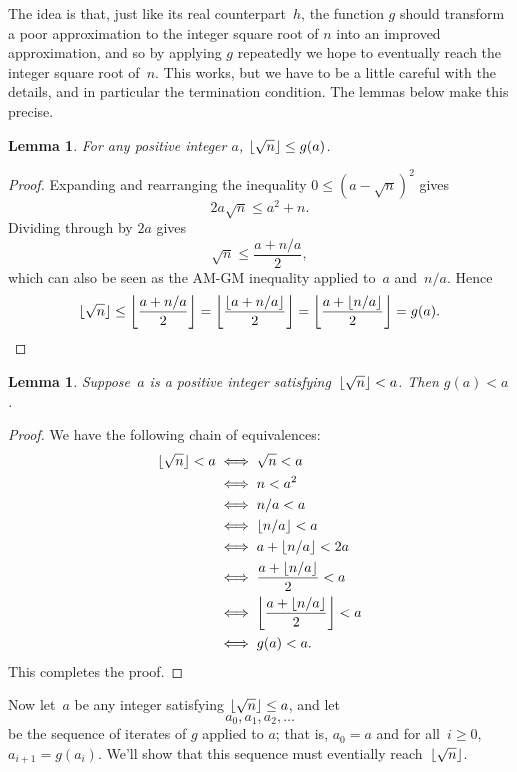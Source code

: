 \documentclass[a4paper]{article}
\DeclarePairedDelimiter\floor{\lfloor}{\rfloor}
\theoremstyle{plain}
\newtheorem{lemma}[theorem]{Lemma}
\theoremstyle{definition}
\begin{document}
The idea is that, just like its real counterpart~$h$, the function $g$ should
transform a poor approximation to the integer square root of $n$ into an
improved approximation, and so by applying $g$ repeatedly we hope to eventually
reach the integer square root of~$n$. This works, but we have to be a little
careful with the details, and in particular the termination condition. The
lemmas below make this precise.

\begin{lemma}\label{heron_high}
  For any positive integer $a$, $\floor{\sqrt n} \le g(a)$.
\end{lemma}

\begin{proof}
  Expanding and rearranging the inequality $0 \le (a - \sqrt n)^2$ gives
  $$2a\sqrt n \le a^2 + n.$$
  Dividing through by $2a$ gives
  $$\sqrt n \le \frac{a + n/a}2,$$
  which can also be seen as the AM-GM inequality applied to~$a$ and~$n/a$.
  Hence
  $$\floor{\sqrt n} \le \floor*{\frac{a + n/a}2}
  = \floor*{\frac{\floor{a + n/a}}2}
  = \floor*{\frac{a + \floor{n/a}}2} = g(a).$$
\end{proof}

\begin{lemma}\label{heron_decreases}
  Suppose~$a$ is a positive integer satisfying~$\floor{\sqrt n} < a$. Then
  $g(a) < a$.
\end{lemma}

\begin{proof}
  We have the following chain of equivalences:
  \begin{align*}
    \floor{\sqrt n} < a &\iff \sqrt n < a \\
                        &\iff n < a^2 \\
                        &\iff n/a < a \\
                        &\iff \floor{n/a} < a \\
                        &\iff a + \floor{n/a} < 2a \\
                        &\iff \frac{a + \floor{n/a}}2 < a \\
                        &\iff \floor*{\frac{a + \floor{n/a}}2} < a \\
                        &\iff g(a) < a.
  \end{align*}
  This completes the proof.
\end{proof}

Now let~$a$ be any integer satisfying $\floor{\sqrt n} \le a$, and let
$$a_0, a_1, a_2, \dots$$ be the sequence of iterates of $g$ applied to $a$;
that is, $a_0 = a$ and for all~$i \ge 0$, $a_{i+1} = g(a_i)$. We'll show that
this sequence must eventially reach~$\floor{\sqrt n}$.
\end{document}
